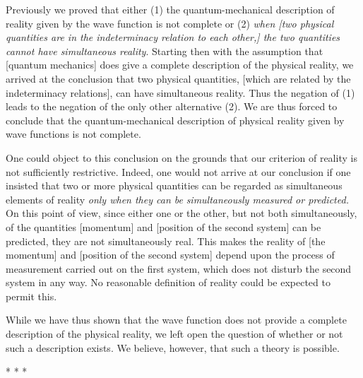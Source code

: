 Previously we proved that either (1) the quantum-mechanical description
of reality given by the wave function is not complete or (2) \emph{when
{[}two physical quantities are in the indeterminacy relation to each
other,{]} the two quantities cannot have simultaneous reality}. Starting
then with the assumption that {[}quantum mechanics{]} does give a
complete description of the physical reality, we arrived at the
conclusion that two physical quantities, {[}which are related by the
indeterminacy relations{]}, can have simultaneous reality. Thus the
negation of (1) leads to the negation of the only other alternative (2).
We are thus forced to conclude that the quantum-mechanical description
of physical reality given by wave functions is not complete.

One could object to this conclusion on the grounds that our criterion of
reality is not sufficiently restrictive. Indeed, one would not arrive at
our conclusion if one insisted that two or more physical quantities can
be regarded as simultaneous elements of reality \emph{only when they can
be} \emph{simultaneously measured or predicted.} On this point of view,
since either one or the other, but not both simultaneously, of the
quantities {[}momentum{]} and {[}position of the second system{]} can be
predicted, they are not simultaneously real. This makes the reality of
{[}the momentum{]} and {[}position of the second system{]} depend upon
the process of measurement carried out on the first system, which does
not disturb the second system in any way. No reasonable definition of
reality could be expected to permit this.

While we have thus shown that the wave function does not provide a
complete description of the physical reality, we left open the question
of whether or not such a description exists. We believe, however, that
such a theory is possible.\\
\centerline{* * *}
%
